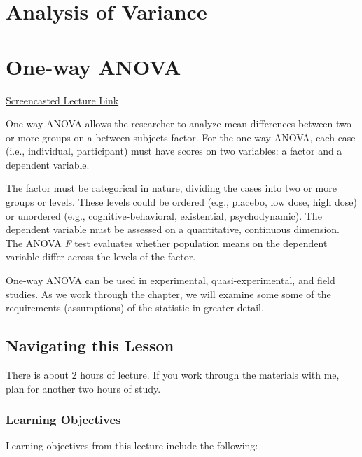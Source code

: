 \documentclass[
  11pt,
]{book}
\begin{document}
\hypertarget{analysis-of-variance}{%
\chapter*{Analysis of Variance}\label{analysis-of-variance}}


\hypertarget{oneway}{%
\chapter{One-way ANOVA}\label{oneway}}

\href{https://spu.hosted.panopto.com/Panopto/Pages/Viewer.aspx?pid=c88f8492-0599-462d-a471-ad8a01702156}{Screencasted Lecture Link}

One-way ANOVA allows the researcher to analyze mean differences between two or more groups on a between-subjects factor. For the one-way ANOVA, each case (i.e., individual, participant) must have scores on two variables: a factor and a dependent variable.

The factor must be categorical in nature, dividing the cases into two or more groups or levels. These levels could be ordered (e.g., placebo, low dose, high dose) or unordered (e.g., cognitive-behavioral, existential, psychodynamic). The dependent variable must be assessed on a quantitative, continuous dimension. The ANOVA \emph{F} test evaluates whether population means on the dependent variable differ across the levels of the factor.

One-way ANOVA can be used in experimental, quasi-experimental, and field studies. As we work through the chapter, we will examine some some of the requirements (assumptions) of the statistic in greater detail.

\hypertarget{navigating-this-lesson-5}{%
\section{Navigating this Lesson}\label{navigating-this-lesson-5}}

There is about 2 hours of lecture. If you work through the materials with me, plan for another two hours of study.

\hypertarget{learning-objectives-5}{%
\subsection{Learning Objectives}\label{learning-objectives-5}}

Learning objectives from this lecture include the following:
\end{document}

